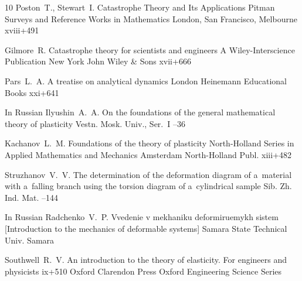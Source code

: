 \begin{thebibliography}{10}
\by Poston~T., Stewart~I.
\book Catastrophe Theory and Its Applications
\publ Pitman
\serial Surveys and Reference Works in Mathematics
\publaddr London, San Francisco, Melbourne
\totalpages xviii+491 

\by Gilmore~R.
\book Catastrophe theory for scientists and engineers
\serial A Wiley-Interscience Publication
\publaddr New York 
\publ John Wiley \& Sons
\totalpages xvii+666 

\by Pars~L.~A.
\book A treatise on analytical dynamics
\publaddr London
\publ Heinemann Educational Books 
\totalpages xxi+641 
 
\lang In Russian
\by Ilyushin~A.~A.
\paper On the foundations of the general mathematical theory of plasticity
\jour Vestn. Mosk. Univ., Ser.~I 
--36



\by Kachanov~L.~M.
\book Foundations of the theory of plasticity
\serial North-Holland Series in Applied Mathematics and Mechanics
\publaddr Amsterdam
\publ North-Holland Publ.
\totalpages xiii+482 


\by Struzhanov~V.~V.
\paper The determination of the deformation diagram of a~material with a~falling branch using the torsion diagram of a~cylindrical sample
\jour Sib. Zh. Ind. Mat.
--144

\lang In Russian
\by Radchenko~V.~P.
\book Vvedenie v mekhaniku deformiruemykh sistem \rm [Introduction to the mechanics of deformable systems]
\publ Samara State Technical Univ.
\publaddr Samara


\by Southwell~R.~V.
\book An introduction to the theory of elasticity. For engineers and physicists
\totalpages ix+510 
\publaddr Oxford
\publ Clarendon Press
\serial Oxford Engineering Science Series


\end{thebibliography}


%

